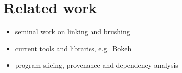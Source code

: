 \section{Related work}

\begin{itemize}
  \item seminal work on linking and brushing
  \item current tools and libraries, e.g.~Bokeh
  \item program slicing, provenance and dependency analysis
\end{itemize}
